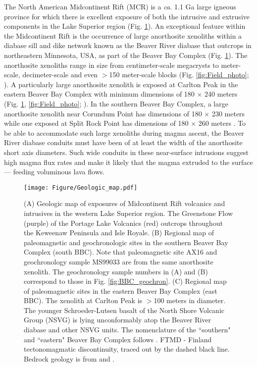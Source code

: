 The North American Midcontinent Rift (MCR) is a \textit{ca.} 1.1 Ga large igneous province for which there is excellent exposure of both the intrusive and extrusive components in the Lake Superior region (Fig. \ref{fig:Geologic_map}). An exceptional feature within the Midcontinent Rift is the occurrence of large anorthosite xenoliths within a diabase sill and dike network known as the Beaver River diabase that outcrops in northeastern Minnesota, USA, as part of the Beaver Bay Complex (Fig. \ref{fig:Geologic_map}). The anorthosite xenoliths range in size from centimeter-scale megacrysts to meter-scale, decimeter-scale and even $>$150 meter-scale blocks (Fig. \ref{fig:Field_photo}; ). A particularly large anorthosite xenolith is exposed at Carlton Peak in the eastern Beaver Bay Complex with minimum dimensions of 180 $\times$ 240 meters (Fig. \ref{fig:Geologic_map}, \ref{fig:Field_photo}; ). In the southern Beaver Bay Complex, a large anorthosite xenolith near Corundum Point has dimensions of 180 $\times$ 230 meters while one exposed at Split Rock Point has dimensions of 180 $\times$ 260 meters \cite{Boerboom2004a}. To be able to accommodate such large xenoliths during magma ascent, the Beaver River diabase conduits must have been of at least the width of the anorthosite short axis diameters. Such wide conduits in these near-surface intrusions suggest high magma flux rates and make it likely that the magma extruded to the surface --- feeding voluminous lava flows.  

\begin{figure}[h!]
\noindent\texttt{[image: Figure/Geologic\_map.pdf]}
\centering
\caption{\footnotesize{(A) Geologic map of exposures of Midcontinent Rift volcanics and intrusives in the western Lake Superior region. The Greenstone Flow (purple) of the Portage Lake Volcanics (red) outcrops throughout the Keweenaw Peninsula and Isle Royale. (B) Regional map of paleomagnetic and geochronologic sites in the southern Beaver Bay Complex (south BBC). Note that paleomagnetic site AX16 and geochronology sample MS99033 are from the same anorthosite xenolith. The geochronology sample numbers in (A) and (B) correspond to those in Fig. \ref{fig:BBC_geochron}. (C) Regional map of paleomagnetic sites in the eastern Beaver Bay Complex (east BBC). The xenolith at Carlton Peak is $>$100 meters in diameter. The younger Schroeder-Lutsen basalt of the North Shore Volcanic Group (NSVG) is lying unconformably atop the Beaver River diabase and other NSVG units. The nomenclature of the ``southern" and ``eastern" Beaver Bay Complex follows . FTMD - Finland tectonomagmatic discontinuity, traced out by the dashed black line. Bedrock geology is from  and .}}
\label{fig:Geologic_map}
\end{figure}

